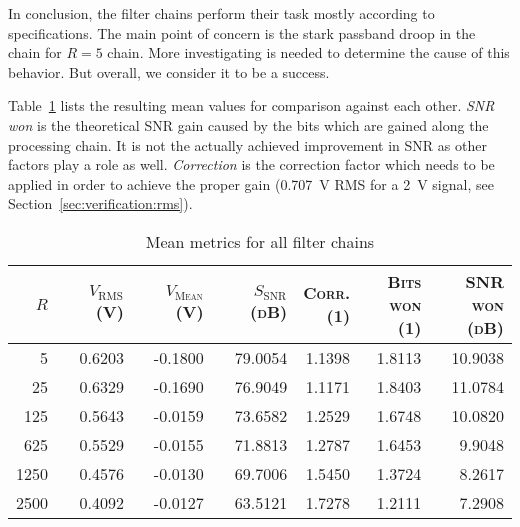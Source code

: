 In  conclusion, the  filter  chains  perform their  task  mostly according  to
specifications. The main point  of concern is the stark passband  droop in the
chain for $R=5$ chain. More investigating is  needed to determine the cause of
this behavior. But overall, we consider it to be a success.

Table~\ref{tab:verification:results}  lists  the  resulting  mean  values  for
comparison  against each  other. \emph{SNR  won} is  the theoretical  SNR gain
caused by the bits which are gained  along the processing chain. It is not the
actually achieved  improvement in SNR  as other factors  play a role  as well.
\emph{Correction} is the correction factor which  needs to be applied in order
to achieve the proper gain (\SI{0.707}{\volt} RMS for a \SI{2}{\V_}
signal, see Section~\ref{sec:verification:rms}).

\begin{table}
    \centering
    \caption[Mean Metrics for All Filter Chains]{Mean metrics for all filter chains}
    \label{tab:verification:results}
    \begin{tabular}{rrrrrrr}
        \toprule
        {\scshape $R$                 }& 
        {\scshape $V_\mathrm{RMS}$ (\si{V})  }& 
        {\scshape $V_\mathrm{Mean}$ (\si{V}) }& 
        {\scshape $S_\mathrm{SNR}$ (\si{dB}) }&  %
        {\parbox[t]{16mm}{\raggedleft\scshape Corr.\\(\si{1})}}& 
        {\parbox[t]{16mm}{\raggedleft\scshape Bits\\won (\si{1})}}& 
        {\parbox[t]{16mm}{\raggedleft\scshape SNR\\won (\si{dB})}}\\
        \midrule
        5           & 0.6203   & -0.1800   & 79.0054   & 1.1398   & 1.8113   & 10.9038\\
        25          & 0.6329   & -0.1690   & 76.9049   & 1.1171   & 1.8403   & 11.0784\\
        125         & 0.5643   & -0.0159   & 73.6582   & 1.2529   & 1.6748   & 10.0820\\
        625         & 0.5529   & -0.0155   & 71.8813   & 1.2787   & 1.6453   & 9.9048\\
        1250        & 0.4576   & -0.0130   & 69.7006   & 1.5450   & 1.3724   & 8.2617\\
        2500        & 0.4092   & -0.0127   & 63.5121   & 1.7278   & 1.2111   & 7.2908\\
        \bottomrule
    \end{tabular}
\end{table}


